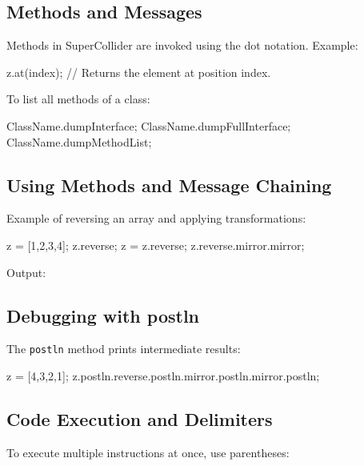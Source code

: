 \subsection{Methods and Messages}

Methods in SuperCollider are invoked using the dot notation. Example:

\begin{supercollider*}
z.at(index); // Returns the element at position index.
\end{supercollider*}

To list all methods of a class:

\begin{supercollider*}
ClassName.dumpInterface;
ClassName.dumpFullInterface;
ClassName.dumpMethodList;
\end{supercollider*}

\subsection{Using Methods and Message Chaining}

Example of reversing an array and applying transformations:

\begin{supercollider*}
z = [1,2,3,4];
z.reverse;
z = z.reverse;
z.reverse.mirror.mirror;
\end{supercollider*}

Output:

\begin{supercollider*}
[ 4, 3, 2, 1 ]
[ 1, 2, 3, 4 ]
[ 1, 2, 3, 4, 3, 2, 1, 2, 3, 4, 3, 2, 1 ]
\end{supercollider*}

\subsection{Debugging with postln}

The \texttt{postln} method prints intermediate results:

\begin{supercollider*}
z = [4,3,2,1];
z.postln.reverse.postln.mirror.postln.mirror.postln;
\end{supercollider*}

\subsection{Code Execution and Delimiters}

To execute multiple instructions at once, use parentheses:

